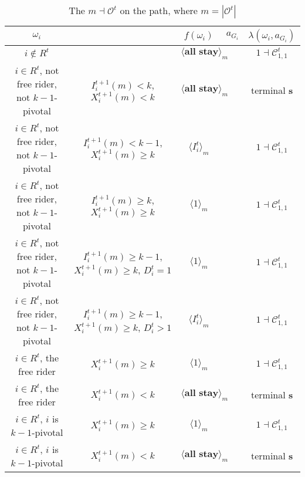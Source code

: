 \documentclass[12pt,letter]{article}
\newcommand{\Kappa}{\mathcal{C}}
\newcommand{\Omicron}{\mathcal{O}}
\theoremstyle{definition}
\theoremstyle{remark}
\theoremstyle{claim}
\begin{document}
\begin{landscape}
\begin{table}[!htbp]
\caption{The $m\dashv\Omicron^t$ on the path, where $m=|\Omicron^t|$}
\label{table:eqm_path_ot2}
\begin{center}
\begin{tabular}{c c | c | c | c}
$\omega_i$ 	 & 	   &	$f(\omega_i)$  &	$a_{G_i}$ & $\lambda(\omega_i,a_{G_i})$ \\
\hline
\hline
$i\notin R^t$  	& 								& $\langle \textbf{all stay} \rangle_m$		&  			& $1\dashv \Kappa^t_{1,1}$ \\
$i\in R^t$, not free rider, not $k-1$-pivotal		 	&  $I^{t+1}_i(m)< k$, $X^{t+1}_i(m)<k$			&  $\langle \textbf{all stay} \rangle_m$	& 	& terminal \textbf{s} \\
$i\in R^t$, not free rider, not $k-1$-pivotal	  	& $I^{t+1}_i(m)<k-1$, $X^{t+1}_i(m)\geq k$		    & $\langle I^t_i \rangle_m$ 		&    			& $1\dashv \Kappa^t_{1,1}$ \\
$i\in R^t$, not free rider, not $k-1$-pivotal	 	&  $I^{t+1}_i(m)\geq k$, $X^{t+1}_i(m)\geq k$	& $\langle 1 \rangle_m$ 	& 	& $1\dashv \Kappa^t_{1,1}$ \\
$i\in R^t$, not free rider, not $k-1$-pivotal	 	&  $I^{t+1}_i(m)\geq k-1$, $X^{t+1}_i(m)\geq k$, $D^t_i=1$	& $\langle 1 \rangle_m$ 	& 	& $1\dashv \Kappa^t_{1,1}$ \\
$i\in R^t$, not free rider, not $k-1$-pivotal	 	&  $I^{t+1}_i(m)\geq k-1$, $X^{t+1}_i(m)\geq k$, $D^t_i>1$	& $\langle I^t_i \rangle_m$ 	& 	& $1\dashv \Kappa^t_{1,1}$ \\
$i\in R^t$, the free rider  	&  $X^{t+1}_i(m)\geq k$ & $\langle 1 \rangle_m$ 		& 				  & $1\dashv \Kappa^t_{1,1}$ \\
$i\in R^t$, the free rider  	&  		$X^{t+1}_i(m)<k$					&  $\langle \textbf{all stay} \rangle_m$		& 										  & terminal \textbf{s} \\
$i\in R^t$, $i$ is $k-1$-pivotal  	&  $X^{t+1}_i(m)\geq k$ & $\langle 1 \rangle_m$ 	& 											 & $1\dashv \Kappa^t_{1,1}$ \\
$i\in R^t$, $i$ is $k-1$-pivotal  	&  	$X^{t+1}_i(m)<k$		&  $\langle \textbf{all stay} \rangle_m$	& 											 & terminal \textbf{s} \\
\hline
\end{tabular}
\end{center}
\end{table}


\end{landscape}
\end{document}
